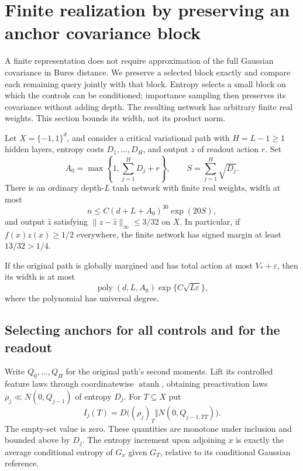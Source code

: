 \section{Finite realization by preserving an anchor covariance block}
\label{sec:critical-anchored-compression}

A finite representation does not require approximation of the full
Gaussian covariance in Bures distance. We preserve a selected block
exactly and compare each remaining query jointly with that block.
Entropy selects a small block on which the controls can be conditioned;
importance sampling then preserves its covariance without adding depth.
The resulting network has arbitrary finite real weights. This section
bounds its width, not its product norm.

\begin{theorem}
\label{thm:anchored-critical-compression}
\label{thm:critical-anchored-compression}
Let $X=\{-1,1\}^d$, and consider a critical variational path with
$H=L-1\ge1$ hidden layers, entropy costs $D_1,\ldots,D_H$, and
output $z$ of readout action $r$. Set
\[
 A_0=\max\left\{1,\sum_{j=1}^H D_j+r\right\},
 \qquad S=\sum_{j=1}^H\sqrt{D_j}.
\]
There is an ordinary depth-$L$ tanh network with finite real weights,
width at most
\[
 n\le C(d+L+A_0)^{30}\exp(20S),
\]
and output $\widehat z$ satisfying
$\|z-\widehat z\|_\infty\le3/32$ on $X$.
In particular, if $f(x)z(x)\ge1/2$ everywhere, the finite network
has signed margin at least $13/32>1/4$.

If the original path is globally margined and has total action at most
$V_*+\varepsilon$, then its width is at most
\[
 \operatorname{poly}(d,L,A_0)\exp\{C\sqrt{L\varepsilon}\},
\]
where the polynomial has universal degree.
\end{theorem}

\subsection{Selecting anchors for all controls and for the readout}

Write $Q_0,\ldots,Q_H$ for the original path's second moments.
Lift its controlled feature laws through coordinatewise
$\operatorname{atanh}$, obtaining preactivation laws
$\rho_j\ll N(0,Q_{j-1})$ of entropy $D_j$.
For $T\subseteq X$ put
\[
 I_j(T)=D\bigl((\rho_j)_T\Vert N(0,Q_{j-1,TT})\bigr).
\]
The empty-set value is zero. These quantities are monotone under
inclusion and bounded above by $D_j$. The entropy increment upon
adjoining $x$ is exactly the average conditional entropy of $G_x$
given $G_T$, relative to its conditional Gaussian reference.

